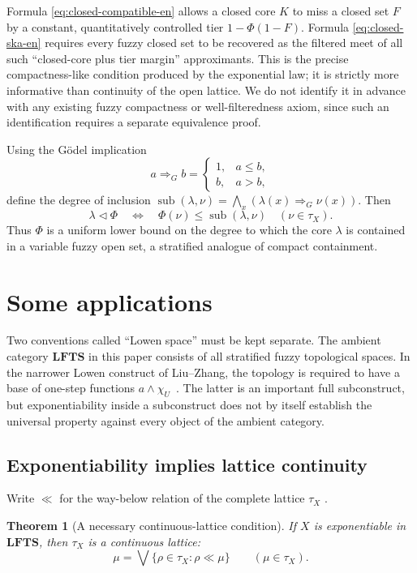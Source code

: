 \documentclass[11pt,a4paper]{article}
\numberwithin{equation}{section}
\newtheorem{theorem}{Theorem}[section]
\theoremstyle{definition}
\theoremstyle{remark}
\newcommand{\LFTS}{\mathbf{LFTS}}
\newcommand{\sub}{\operatorname{sub}}
\begin{document}
Formula \eqref{eq:closed-compatible-en} allows a closed core \(K\) to
miss a closed set \(F\) by a constant, quantitatively controlled tier
\(1-\Phi(1-F)\).  Formula \eqref{eq:closed-ska-en} requires every fuzzy
closed set to be recovered as the filtered meet of all such
``closed-core plus tier margin'' approximants.  This is the precise
compactness-like condition produced by the exponential law; it is
strictly more informative than continuity of the open lattice.  We do
not identify it in advance with any existing fuzzy compactness or
well-filteredness axiom, since such an identification requires a
separate equivalence proof.

Using the Gödel implication
\[
 a\Rightarrow_G b=
 \begin{cases}1,&a\leq b,\\b,&a>b,\end{cases}
\]
define the degree of inclusion
\(\sub(\lambda,\nu)=\bigwedge_x
(\lambda(x)\Rightarrow_G\nu(x))\).  Then
\[
 \lambda\triangleleft\Phi
 \quad\Longleftrightarrow\quad
 \Phi(\nu)\leq\sub(\lambda,\nu)
 \quad(\nu\in\tau_X).
\]
Thus \(\Phi\) is a uniform lower bound on the degree to which the core
\(\lambda\) is contained in a variable fuzzy open set, a stratified
analogue of compact containment.

\section{Some applications}
\label{sec:questions}

Two conventions called ``Lowen space'' must be kept separate.  The
ambient category \(\LFTS\) in this paper consists of all stratified
fuzzy topological spaces.  In the narrower Lowen construct of
Liu--Zhang, the topology is required to have a base of one-step
functions \(a\wedge\chi_U\)~\cite{LiuZhang2000-en}.  The latter is an important full
subconstruct, but exponentiability inside a subconstruct does not by
itself establish the universal property against every object of the
ambient category.

\subsection{Exponentiability implies lattice continuity}

Write \(\ll\) for the way-below relation of the complete lattice
\(\tau_X\) \cite{Gierz1980}.

\begin{theorem}[A necessary continuous-lattice condition]
\label{thm:continuous-en}
If \(X\) is exponentiable in \(\LFTS\), then \(\tau_X\) is a continuous
lattice:
\[
 \mu=\bigvee\{\rho\in\tau_X:\rho\ll\mu\}
 \qquad(\mu\in\tau_X).
\]
\end{theorem}
\end{document}
